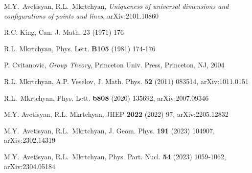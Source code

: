 \documentclass{article}
\begin{document}
\begin{thebibliography}{12}
 M.Y.~Avetisyan, R.L.~Mkrtchyan,
{\sl Uniqueness of universal dimensions and configurations of points and lines},
arXiv:2101.10860

 R.C. King, %
Can. J. Math. 23 (1971) 176

 R.L. Mkrtchyan, %
Phys. Lett. {\bf B105} (1981) 174-176

 P. Cvitanovic, {\sl Group Theory}, Princeton Univ. Press, Princeton, NJ, 2004

 R.L. Mkrtchyan, A.P. Veselov, %
J. Math. Phys. {\bf 52} (2011) 083514, arXiv:1011.0151


 R.L.~Mkrtchyan,
Phys. Lett. \textbf{b808} (2020) 135692,
arXiv:2007.09346

 M.Y. Avetisyan, R.L. Mkrtchyan, %
JHEP {\bf 2022} (2022) 97, arXiv:2205.12832

 M.Y.~Avetisyan, R.L.~Mkrtchyan,
J. Geom. Phys. \textbf{191} (2023) 104907,
arXiv:2302.14319

 M.Y.~Avetisyan, R.L.~Mkrtchyan,
Phys. Part. Nucl. \textbf{54} (2023) 1059-1062,
arXiv:2304.05184









\end{thebibliography}
\end{document}
